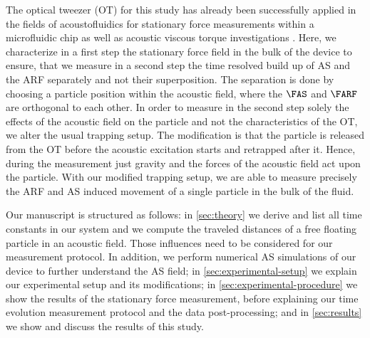 The optical tweezer (OT) for this study has already been successfully applied 
in the fields of acoustofluidics for stationary force measurements within a 
microfluidic chip \cite{Lamprecht2016,Lakaemper2015} as well as acoustic 
viscous torque investigations \cite{Lamprecht2021}. Here, we characterize in a 
first step the stationary force field in the bulk of the device to ensure, that 
we measure in a second step the time resolved build up of AS and the ARF 
separately and not their superposition. The separation is done by choosing a 
particle position within the acoustic field, where the $\FAS$ and $\FARF$ are 
orthogonal to each other. In order to measure in the second step solely the 
effects of the acoustic field on the particle and not the characteristics of 
the OT, we alter the usual trapping setup. The modification is that the 
particle is released from the OT before the acoustic excitation starts and 
retrapped after it.  Hence, during the measurement just gravity and the forces 
of the acoustic field act upon the particle. With our modified trapping setup, 
we are able to measure precisely the ARF and AS induced movement of a single 
particle in the bulk of the fluid.

Our manuscript is structured as follows: in \cref{sec:theory} we derive and 
list all time constants in our system and we compute the traveled distances of 
a free floating particle in an acoustic field. Those influences need to be 
considered for our measurement protocol. In addition, we perform numerical AS 
simulations of our device to further understand the AS field; in 
\cref{sec:experimental-setup} we explain our experimental setup and its 
modifications; in \cref{sec:experimental-procedure} we show the results of the 
stationary force measurement, before explaining our time evolution measurement 
protocol and the data post-processing; and in \cref{sec:results} we show and 
discuss the results of this study.



